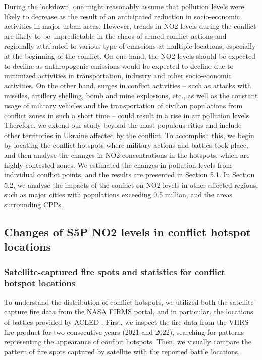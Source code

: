 During the lockdown, one might reasonably assume that pollution levels were likely to decrease as the result of an anticipated reduction in socio-economic activities in major urban areas. However, trends in NO2 levels during the conflict are likely to be unpredictable in the chaos of armed conflict actions and regionally attributed to various type of emissions at multiple locations, especially at the beginning of the conflict. On one hand, the NO2 levels should be expected to decline as anthropogenic emissions would be expected to decline due to minimized activities in transportation, industry and other socio-economic activities. On the other hand, surges in conflict activities – such as attacks with missiles, artillery shelling, bomb and mine explosions, etc., as well as the constant usage of military vehicles and the transportation of civilian populations from conflict zones in such a short time – could result in a rise in air pollution levels. Therefore, we extend our study beyond the most populous cities and include other territories in Ukraine affected by the conflict. To accomplish this, we begin by locating the conflict hotspots where military actions and battles took place, and then analyse the changes in NO2 concentrations in the hotspots, which are highly contested zones. We estimated the changes in pollution levels from individual conflict points, and the results are presented in Section 5.1. In Section 5.2, we analyse the impacts of the conflict on NO2 levels in other affected regions, such as major cities with populations exceeding 0.5 million, and the areas surrounding CPPs.\par
\subsection{Changes of S5P NO2 levels in conflict hotspot locations}
\subsubsection*{Satellite-captured fire spots and statistics for conflict hotspot locations}
To understand the distribution of conflict hotspots, we utilized both the satellite-capture fire data from the NASA FIRMS portal, and in particular, the locations of battles provided by ACLED \citep{raleigh2010introducing}. First, we inspect the fire data from the VIIRS fire product for two consecutive years (2021 and 2022), searching for patterns representing the appearance of conflict hotspots. Then, we visually compare the pattern of fire spots captured by satellite with the reported battle locations.\par

